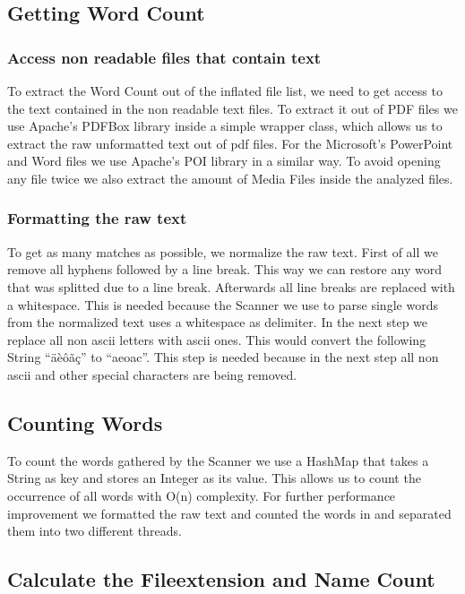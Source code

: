 \documentclass[paper=A4,pagesize=auto,12pt,headinclude=true,footinclude=true,BCOR=0mm,DIV=calc]{scrartcl}
\begin{document}
	\subsection{Getting Word Count}
	
	\subsubsection{ Access non readable files that contain text}
	To extract the Word Count out of the inflated file list, we need to get access to the text contained in the non readable text files. To extract it out of PDF files we use Apache’s PDFBox library inside a simple wrapper class, which allows us to extract the raw unformatted text out of pdf files. For the Microsoft’s PowerPoint and Word files we use Apache’s POI library in a similar way.
	To avoid opening any file twice we also extract the amount of Media Files inside the analyzed files. 
	
	
	
	\subsubsection{Formatting the raw text}
	To get as many matches as possible, we normalize the raw text. First of all we remove all hyphens followed by a line break. This way we can restore any word that was splitted due to a line break. Afterwards all line breaks are replaced with a whitespace. This is needed because the Scanner we use to parse single words from the normalized text uses a whitespace as delimiter. In the next step we replace all non ascii letters with ascii ones. This would convert the following String “äèôãç” to “aeoac”. This step is needed because in the next step all non ascii and other special characters are being removed.
	
	\subsection{Counting Words}
	To count the words gathered by the Scanner we use a HashMap that takes a String as key and stores an Integer as its value. This allows us to count the occurrence of all words with O(n) complexity. For further performance improvement we formatted the raw text and counted the words in and separated them into two different threads.
	
	\subsection{Calculate the Fileextension and Name Count}
	
\end{document}

